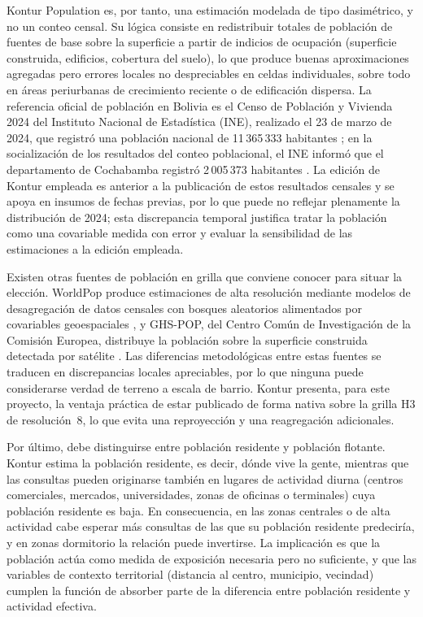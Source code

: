 Kontur Population es, por tanto, una estimación modelada de tipo dasimétrico, y no un conteo
censal. Su lógica consiste en redistribuir totales de población de fuentes de base sobre la
superficie a partir de indicios de ocupación (superficie construida, edificios, cobertura
del suelo), lo que produce buenas aproximaciones agregadas pero errores locales no
despreciables en celdas individuales, sobre todo en áreas periurbanas de crecimiento
reciente o de edificación dispersa. La referencia oficial de población en Bolivia es el
Censo de Población y Vivienda 2024 del Instituto Nacional de Estadística (INE), realizado el
23 de marzo de 2024, que registró una población nacional de 11\,365\,333 habitantes
\parencite{ine2025}; en la socialización de los resultados del conteo poblacional, el INE
informó que el departamento de Cochabamba registró 2\,005\,373 habitantes
\parencite{ine2024}. La edición de Kontur empleada es anterior a la publicación de
estos resultados censales y se apoya en insumos de fechas previas, por lo que puede no
reflejar plenamente la distribución de 2024; esta discrepancia temporal justifica tratar la
población como una covariable medida con error y evaluar la sensibilidad de las estimaciones
a la edición empleada.

Existen otras fuentes de población en grilla que conviene conocer para situar la elección.
WorldPop produce estimaciones de alta resolución mediante modelos de desagregación de datos
censales con bosques aleatorios alimentados por covariables geoespaciales
\parencite{stevens2015,tatem2017}, y GHS-POP, del Centro Común de Investigación de la
Comisión Europea, distribuye la población sobre la superficie construida detectada por
satélite \parencite{schiavina2023}. Las diferencias metodológicas entre estas fuentes se
traducen en discrepancias locales apreciables, por lo que ninguna puede considerarse verdad
de terreno a escala de barrio. Kontur presenta, para este proyecto, la ventaja práctica de
estar publicado de forma nativa sobre la grilla H3 de resolución~8, lo que evita una
reproyección y una reagregación adicionales.

Por último, debe distinguirse entre población residente y población flotante. Kontur estima
la población residente, es decir, dónde vive la gente, mientras que las consultas pueden
originarse también en lugares de actividad diurna (centros comerciales, mercados,
universidades, zonas de oficinas o terminales) cuya población residente es baja. En
consecuencia, en las zonas centrales o de alta actividad cabe esperar más consultas de las
que su población residente predeciría, y en zonas dormitorio la relación puede invertirse.
La implicación es que la población actúa como medida de exposición necesaria pero no
suficiente, y que las variables de contexto territorial (distancia al centro, municipio,
vecindad) cumplen la función de absorber parte de la diferencia entre población residente y
actividad efectiva.

